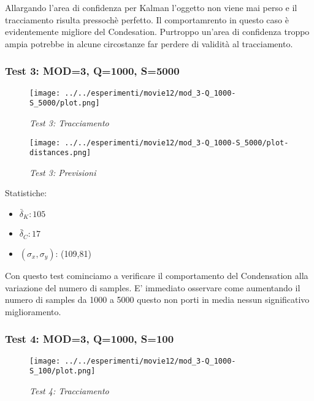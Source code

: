 Allargando l'area di confidenza per Kalman l'oggetto non viene mai perso e il tracciamento risulta pressochè perfetto. Il comportamrento in questo caso è evidentemente migliore del Condesation. Purtroppo un'area di confidenza troppo ampia potrebbe in alcune circostanze far perdere di validità al tracciamento. 

\newpage
\subsubsection{Test 3: MOD=3, Q=1000, S=5000}

\begin{figure}[hb]
\centering
\texttt{[image: ../../esperimenti/movie12/mod\_3-Q\_1000-S\_5000/plot.png]}
\caption{\textit{Test 3: Tracciamento}}
\end{figure}

\begin{figure}[hb]
\centering
\texttt{[image: ../../esperimenti/movie12/mod\_3-Q\_1000-S\_5000/plot-distances.png]}
\caption{\textit{Test 3: Previsioni}}
\end{figure}

Statistiche:
\begin{itemize}
\item \begin{math} \bar \delta_K: 105 \end{math}
\item \begin{math} \bar \delta_C: 17 \end{math}
\item \begin{math}(\sigma_x,\sigma_y)\end{math}: (109,81)
\end{itemize}

Con questo test cominciamo a verificare il comportamento del Condensation alla variazione del numero di samples.
E' immediato osservare come aumentando il numero di samples da 1000 a 5000 questo non porti in media nessun significativo miglioramento.

\newpage
\subsubsection{Test 4: MOD=3, Q=1000, S=100}

\begin{figure}[hb]
\centering
\texttt{[image: ../../esperimenti/movie12/mod\_3-Q\_1000-S\_100/plot.png]}
\caption{\textit{Test 4: Tracciamento}}
\end{figure}

